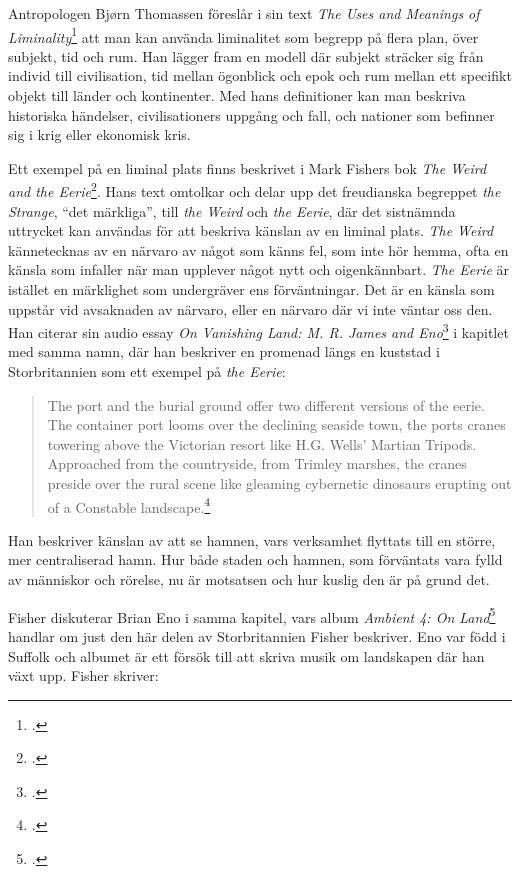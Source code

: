 \documentclass{article}
\begin{document}
Antropologen Bjørn Thomassen föreslår i sin text \emph{The Uses and Meanings of
Liminality}\footcite[12-13]{Thomassen} att man kan använda liminalitet som begrepp på flera plan, över
subjekt, tid och rum. Han lägger fram en modell där subjekt sträcker sig från individ till civilisation, tid
mellan ögonblick och epok och rum mellan ett specifikt objekt till länder och kontinenter. Med hans
definitioner kan man beskriva historiska händelser, civilisationers uppgång och fall, och nationer som
befinner sig i krig eller ekonomisk kris.

Ett exempel på en liminal plats finns beskrivet i Mark Fishers bok \emph{The Weird and the
Eerie}\footcite[8-13]{Fisher}. Hans text omtolkar och delar upp det freudianska begreppet \emph{the Strange},
``det märkliga'', till \emph{the Weird} och \emph{the Eerie}, där det sistnämnda uttrycket kan användas för
att beskriva känslan av en liminal plats. \emph{The Weird} kännetecknas av en närvaro av något som känns fel,
som inte hör hemma, ofta en känsla som infaller när man upplever något nytt och oigenkännbart. \emph{The
Eerie} är istället en märklighet som undergräver ens förväntningar. Det är en känsla som uppstår vid
avsaknaden av närvaro, eller en närvaro där vi inte väntar oss den. Han citerar sin audio essay \emph{On
Vanishing Land: M. R. James and Eno}\footcite{onvanishingland} i kapitlet med samma namn, där han beskriver en promenad längs en
kuststad i Storbritannien som ett exempel på \emph{the Eerie}:

\begin{quote}
The port and the burial ground offer two different versions of the eerie. The container port looms over the
declining seaside town, the ports cranes towering above the Victorian resort like H.G. Wells' Martian Tripods.
Approached from the countryside, from Trimley marshes, the cranes preside over the rural scene like gleaming
	cybernetic dinosaurs erupting out of a Constable landscape.\footcite[76]{Fisher}
\end{quote}

Han beskriver känslan av att se hamnen, vars verksamhet flyttats till en större, mer centraliserad hamn. 
Hur både staden och hamnen, som förväntats vara fylld av människor och rörelse, nu är motsatsen och hur kuslig
den är på grund det.

Fisher diskuterar Brian Eno i samma kapitel, vars album \emph{Ambient 4: On Land}\footcite{EnoLand} handlar om
just den här delen av Storbritannien Fisher beskriver. Eno var född i Suffolk och albumet är ett försök till
att skriva musik om landskapen där han växt upp. Fisher skriver:
\end{document}
